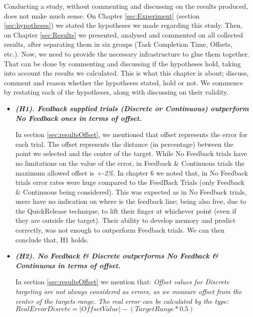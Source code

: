 
Conducting a study, without commenting and discussing on the results produced, does not make much sense. On Chapter \ref{sec:Experiment} (section \ref{sec:hypotheses}) we stated the hypotheses we made regarding this study. Then, on Chapter \ref{sec:Results} we presented, analysed and commented on all collected results, after separating them in six groups (Task Completion Time, Offsets, etc.). Now, we need to provide the necessary infrastructure to glue them together. That can be done by commenting and discussing if the hypotheses hold, taking into account the results we calculated. This is what this chapter is about; discuss, comment and reason whether the hypotheses stated, hold or not. We commence by restating each of the hypotheses, along with discussing on their validity. 
 
\begin{itemize}

    \item \textbf{\textit{(H1). Feedback supplied trials (Discrete or Continuous) outperform No Feedback ones in terms of offset. }}

    In section \ref{sec:resultsOffset}, we mentioned that offset represents the error for each trial. The offset represents the distance (in percentage) between the point we selected and the center of the target. While No Feedback trials have no limitations on the value of the error, in Feedback \& Continuous trials the maximum allowed offset is \emph{+-2\%}.
    In chapter 6 we noted that, in No Feedback trials error rates were huge compared to the FeedBack Trials (only Feedback \& Continuous being considered). This was expected as in No Feedback trials, users have no indication on where is the feedback line; being also free, due to the QuickRelease technique, to lift their finger at whichever point (even if they are outside the target). Their ability to develop memory and predict correctly, was not enough to outperform Feedback trials. We can then conclude that, H1 holds.

    \item \textbf{\textit{(H2). No Feedback \& Discrete outperforms No Feedback \& Continuous in terms of offset.}}
    
    In section \ref{sec:resultsOffset} we mention that:
    \emph{Offset values for Discrete targeting are not always considered as errors, as we measure offset from the center of the targets range. The real error can be calculated by the type:}   $RealErrorDisrete = |OffsetValue| - (TargetRange*0.5)$


\end{itemize}

